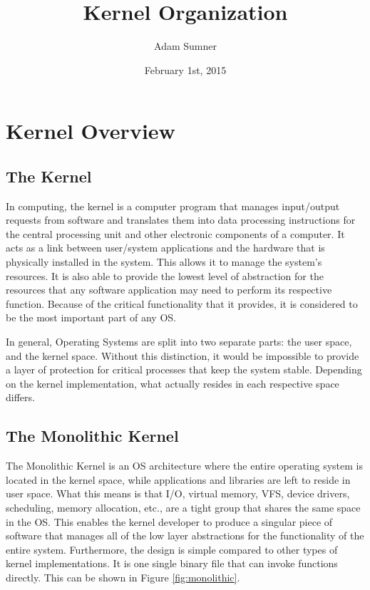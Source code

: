 \documentclass[12pt]{article}
\title{\textbf{Kernel Organization}}
\author{Adam Sumner}
\date{February 1st, 2015 }
\begin{document}

\maketitle
\thispagestyle{empty}

\twocolumn
\setcounter{page}{1}

\section{Kernel Overview}\label{sec:kernel}
\subsection{The Kernel}
In computing, the kernel is a computer program that manages input/output requests from software and translates them into data processing instructions for the central processing unit and other electronic components of a computer\cite{OS}. It acts as a link between user/system applications and the hardware that is physically installed in the system. This allows it to manage the system's resources. It is also able to provide the lowest level of abstraction for the resources that any software application may need to perform its respective function. Because of the critical functionality that it provides, it is considered to be the most important part of any OS. 

In general, Operating Systems are split into two separate parts: the user space, and the kernel space. Without this distinction, it would be impossible to provide a layer of protection for critical processes that keep the system stable. Depending on the kernel implementation, what actually resides in each respective space differs.
\subsection{The Monolithic Kernel}
The Monolithic Kernel is an OS architecture where the entire operating system is located in the kernel space\cite{Mono}, while applications and libraries are left to reside in user space. What this means is that I/O, virtual memory, VFS, device drivers, scheduling, memory allocation, etc., are a tight group that shares the same space in the OS. This enables the kernel developer to produce a singular piece of software that manages all of the low layer abstractions for the functionality of the entire system. Furthermore, the design is simple compared to other types of kernel implementations. It is one single binary file that can invoke functions directly. This can be shown in Figure \ref{fig:monolithic}.
\end{document}
